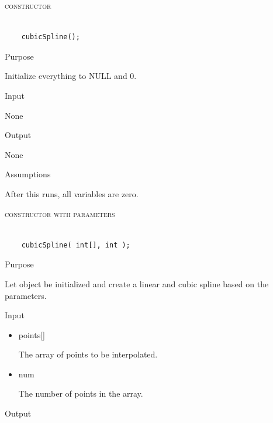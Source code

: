 \documentclass[pdftex, 11pt]{article}
\begin{document}
\begin{description}
	\item{\textsc{constructor}}

		\begin{lstlisting}

	cubicSpline();
		\end{lstlisting}

		\begin{description}
			\item{Purpose}

				Initialize everything to NULL and 0.

			\item{Input}

				None

			\item{Output}

				None

			\item{Assumptions}

				After this runs, all variables are zero.

		\end{description}


	\item{\textsc{constructor with parameters}}

		\begin{lstlisting}

	cubicSpline( int[], int );
		\end{lstlisting}

		\begin{description}
			\item{Purpose}

				Let object be initialized and create a linear and cubic spline based
				on the parameters.

			\item{Input}

				\begin{itemize}

					\item{points[]}

						The array of points to be interpolated.

					\item{num}

						The number of points in the array.

				\end{itemize}

			\item{Output}
			

\end{description}
\end{description}
\end{document}

